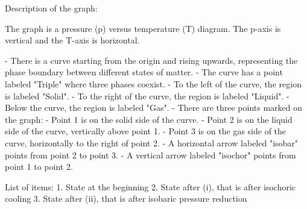 Description of the graph:

The graph is a pressure (p) versus temperature (T) diagram. The p-axis is vertical and the T-axis is horizontal.

- There is a curve starting from the origin and rising upwards, representing the phase boundary between different states of matter.
- The curve has a point labeled "Triple" where three phases coexist.
- To the left of the curve, the region is labeled "Solid".
- To the right of the curve, the region is labeled "Liquid".
- Below the curve, the region is labeled "Gas".
- There are three points marked on the graph:
  - Point 1 is on the solid side of the curve.
  - Point 2 is on the liquid side of the curve, vertically above point 1.
  - Point 3 is on the gas side of the curve, horizontally to the right of point 2.
- A horizontal arrow labeled "isobar" points from point 2 to point 3.
- A vertical arrow labeled "isochor" points from point 1 to point 2.

List of items:
1. State at the beginning
2. State after (i), that is after isochoric cooling
3. State after (ii), that is after isobaric pressure reduction
